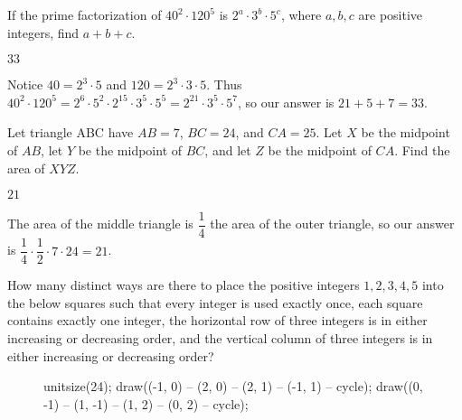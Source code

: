 \documentclass[11pt]{article}
\begin{document}
\begin{problem}
If the prime factorization of $40^2 \cdot 120^5$ is  $2^a \cdot 3^b \cdot 5^c$, where $a,b,c$ are positive integers, find $a+b+c$.
\end{problem}

\begin{answer}
$\boxed{33}$
\end{answer}

\begin{solution}
Notice $40 = 2^3 \cdot 5$ and $120 = 2^{3} \cdot 3 \cdot 5$. Thus $40^2 \cdot 120^5 = 2^6 \cdot 5^2 \cdot 2^{15} \cdot 3^{5} \cdot 5^{5} = 2^{21} \cdot 3^{5} \cdot 5^{7}$, so our answer is $21 + 5 + 7 = \boxed{33}$.
\end{solution}


\begin{problem}
Let triangle ABC have $AB = 7$, $BC = 24$, and $CA = 25$. Let $X$ be the midpoint of $AB$, let $Y$ be the midpoint of $BC$, and let $Z$ be the midpoint of $CA$. Find the area of $XYZ$. 
\end{problem}

\begin{answer}
$\boxed{21}$
\end{answer}

\begin{solution}
The area of the middle triangle is $\dfrac{1}{4}$ the area of the outer triangle, so our answer is $\dfrac{1}{4} \cdot \dfrac{1}{2} \cdot 7 \cdot 24 = \boxed{21}$. 
\end{solution}


\begin{problem}
How many distinct ways are there to place the positive integers $1, 2, 3, 4, 5$ into the below squares such that every integer is used exactly once, each square contains exactly one integer, the horizontal row of three integers is in either increasing or decreasing order, and the vertical column of three integers is in either increasing or decreasing order?
\begin{figure}[h]
	\begin{center}
		\begin{asy}
			unitsize(24);
			draw((-1, 0) -- (2, 0) -- (2, 1) -- (-1, 1) -- cycle);
			draw((0, -1) -- (1, -1) -- (1, 2) -- (0, 2) -- cycle);
		\end{asy}
	\end{center}
\end{figure}
\end{problem}
\end{document}

